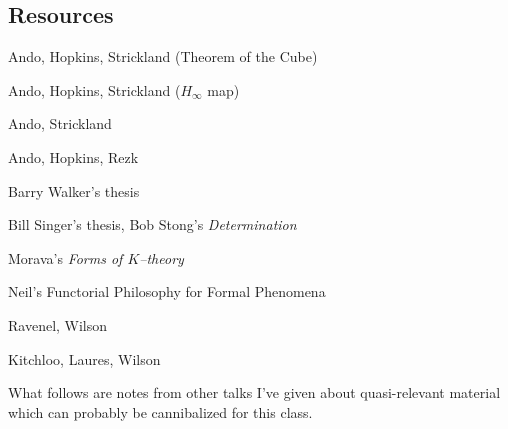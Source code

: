 \documentclass[12pt]{book}
\newcommand{\<}{\langle}
\renewcommand{\>}{\rangle}
\numberwithin{equation}{section}
\theoremstyle{plain}
\theoremstyle{definition}
\theoremstyle{remark}
\begin{document}
\subsection*{Resources}

Ando, Hopkins, Strickland (Theorem of the Cube)

Ando, Hopkins, Strickland ($H_\infty$ map)

Ando, Strickland

Ando, Hopkins, Rezk

Barry Walker's thesis

Bill Singer's thesis, Bob Stong's \textit{Determination}

Morava's \textit{Forms of $K$--theory}

Neil's Functorial Philosophy for Formal Phenomena

Ravenel, Wilson

Kitchloo, Laures, Wilson




\newpage
\newpage
\newpage

\vspace{20\baselineskip}

\begin{center}
What follows are notes from other talks I've given about quasi-relevant material which can probably be cannibalized for this class.
\end{center}



%
\end{document}
